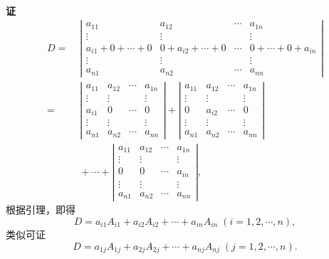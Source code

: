 \paragraph{}
\textbf{证}
\begin{align*}
  D =&\; \left|\begin{array}{cccc}
    a_{11} & a_{12} & \cdots & a_{1n} \\
    \vdots & \vdots & & \vdots \\
    a_{i1}+0+\cdots+0 & 0 + a_{i2}+\cdots+0 & \cdots & 0+\cdots+0+a_{in} \\
    \vdots & \vdots & & \vdots \\
    a_{n1} & a_{n2} & \cdots & a_{nn}
  \end{array} \right| \\
  =&\; \left|\begin{array}{cccc}
    a_{11} & a_{12} & \cdots & a_{1n} \\
    \vdots & \vdots & & \vdots \\
    a_{i1} & 0 & \cdots & 0 \\
    \vdots & \vdots & & \vdots \\
    a_{n1} & a_{n2} & \cdots & a_{nn}
  \end{array} \right| +
  \left|\begin{array}{cccc}
    a_{11} & a_{12} & \cdots & a_{1n} \\
    \vdots & \vdots & & \vdots \\
    0 & a_{i2} & \cdots & 0 \\
    \vdots & \vdots & & \vdots \\
    a_{n1} & a_{n2} & \cdots & a_{nn}
  \end{array} \right| \\
  &\; + \cdots + \left|\begin{array}{cccc}
    a_{11} & a_{12} & \cdots & a_{1n} \\
    \vdots & \vdots & & \vdots \\
    0 & 0 & \cdots & a_{in} \\
    \vdots & \vdots & & \vdots \\
    a_{n1} & a_{n2} & \cdots & a_{nn}
  \end{array} \right|,
\end{align*}
根据引理，即得
\begin{equation*}
  D = a_{i1}A_{i1} + a_{i2}A_{i2} + \cdots + a_{in}A_{in} \; (i = 1,2,\cdots,n),
\end{equation*}
类似可证
\begin{equation*}
  D = a_{1j}A_{1j} + a_{2j}A_{2j} + \cdots + a_{nj}A_{nj} \; (j = 1,2,\cdots,n).
\end{equation*}

